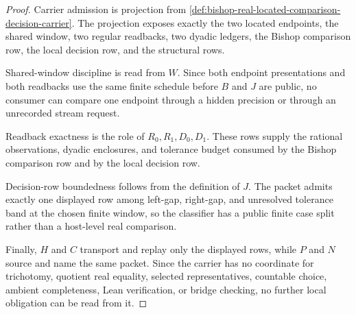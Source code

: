 \begin{proof}
Carrier admission is projection from \autoref{def:bishop-real-located-comparison-decision-carrier}. The projection exposes exactly the two located endpoints, the shared window, two regular readbacks, two dyadic ledgers, the Bishop comparison row, the local decision row, and the structural rows.

Shared-window discipline is read from $W$. Since both endpoint presentations and both readbacks use the same finite schedule before $B$ and $J$ are public, no consumer can compare one endpoint through a hidden precision or through an unrecorded stream request.

Readback exactness is the role of $R_0,R_1,D_0,D_1$. These rows supply the rational observations, dyadic enclosures, and tolerance budget consumed by the Bishop comparison row and by the local decision row.

Decision-row boundedness follows from the definition of $J$. The packet admits exactly one displayed row among left-gap, right-gap, and unresolved tolerance band at the chosen finite window, so the classifier has a public finite case split rather than a host-level real comparison.

Finally, $H$ and $C$ transport and replay only the displayed rows, while $P$ and $N$ source and name the same packet. Since the carrier has no coordinate for trichotomy, quotient real equality, selected representatives, countable choice, ambient completeness, Lean verification, or bridge checking, no further local obligation can be read from it.
\end{proof}

